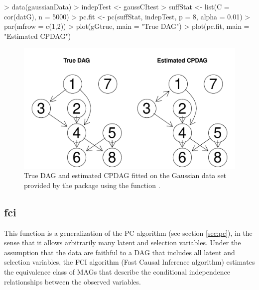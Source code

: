 \documentclass[article]{jss}
\begin{document}
\begin{Schunk}
\begin{Sinput}
> data(gaussianData)
> indepTest <- gaussCItest 
> suffStat <- list(C = cor(datG), n = 5000)
> pc.fit <- pc(suffStat, indepTest, p = 8, alpha = 0.01)
> par(mfrow = c(1,2))
> plot(gGtrue, main = "True DAG")
> plot(pc.fit, main = "Estimated CPDAG")
\end{Sinput}
\end{Schunk}
\begin{figure}
  \begin{center}
\includegraphics{pcalgDoc-011}
\caption{True DAG and estimated CPDAG fitted on the Gaussian data set provided by the
  package using the function .}
\label{fig:pcFit1}
\end{center}
\end{figure}

\subsection{fci}\label{sec:fci}

This function is a generalization of the PC algorithm (see section
\ref{sec:pc}), in the sense that it allows arbitrarily many latent and
selection variables. Under the assumption that the data are faithful to a
DAG that includes all latent and selection variables, the FCI algorithm
(Fast Causal Inference algorithm) estimates the equivalence class of MAGs
that describe the conditional independence relationships between the
observed variables.
\end{document}
